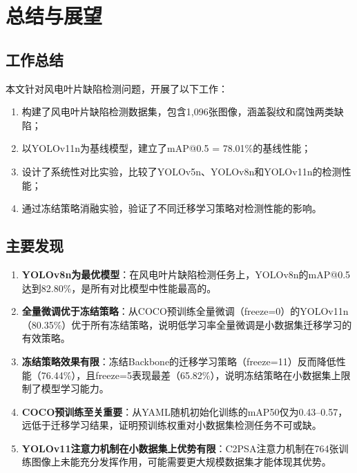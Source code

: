 \documentclass[12pt,a4paper]{article}
\begin{document}
\section{总结与展望}

\subsection{工作总结}

本文针对风电叶片缺陷检测问题，开展了以下工作：
\begin{enumerate}[noitemsep]
  \item 构建了风电叶片缺陷检测数据集，包含1,096张图像，涵盖裂纹和腐蚀两类缺陷；
  \item 以YOLOv11n为基线模型，建立了mAP@0.5 = 78.01\%的基线性能；
  \item 设计了系统性对比实验，比较了YOLOv5n、YOLOv8n和YOLOv11n的检测性能；
  \item 通过冻结策略消融实验，验证了不同迁移学习策略对检测性能的影响。
\end{enumerate}

\subsection{主要发现}

\begin{enumerate}[noitemsep]
  \item \textbf{YOLOv8n为最优模型}：在风电叶片缺陷检测任务上，YOLOv8n的mAP@0.5达到82.80\%，是所有对比模型中性能最高的。

  \item \textbf{全量微调优于冻结策略}：从COCO预训练全量微调（freeze=0）的YOLOv11n（80.35\%）优于所有冻结策略，说明低学习率全量微调是小数据集迁移学习的有效策略。

  \item \textbf{冻结策略效果有限}：冻结Backbone的迁移学习策略（freeze=11）反而降低性能（76.44\%），且freeze=5表现最差（65.82\%），说明冻结策略在小数据集上限制了模型学习能力。

  \item \textbf{COCO预训练至关重要}：从YAML随机初始化训练的mAP50仅为0.43--0.57，远低于迁移学习结果，证明预训练权重对小数据集检测任务不可或缺。

  \item \textbf{YOLOv11注意力机制在小数据集上优势有限}：C2PSA注意力机制在764张训练图像上未能充分发挥作用，可能需要更大规模数据集才能体现其优势。
\end{enumerate}
\end{document}
